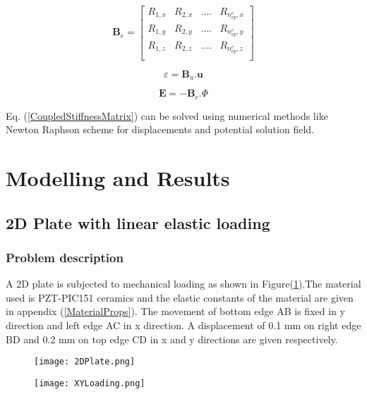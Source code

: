 \documentclass[11pt]{article}
\begin{document}
\begin{equation} \label{BeMatrix}
\textbf{B}_e =
\begin{bmatrix}
R_{1,x} & R_{2,x} & .... & R_{n_{cp}^e,x} \\
R_{1,y} & R_{2,y} & .... & R_{n_{cp}^e,y} \\
R_{1,z} & R_{2,z} & .... & R_{n_{cp}^e,z} \\
\end{bmatrix}
\end{equation}

\begin{equation}
\varepsilon = \textbf{B}_u . \textbf{u}
\end{equation}

\begin{equation}
\textbf{E} = - \textbf{B}_e . \Phi
\end{equation}

\noindent
Eq. (\ref{CoupledStiffnessMatrix}) can be solved using numerical methods like
Newton Raphson scheme for displacements and potential solution field.

\section{Modelling and Results}
\subsection{2D Plate with linear elastic loading}
\subsubsection{Problem description}
A 2D plate is subjected to mechanical loading as shown in Figure(\ref{XYLoading}).The material used is PZT-PIC151 ceramics \cite{kozinov2018simulation} and the elastic constants of the material are given in appendix (\ref{MaterialProps}).
The movement of bottom edge AB is fixed in y direction and left edge AC in x direction. A displacement of 0.1 mm on right edge BD and 0.2 mm on top edge CD in x and y directions are given respectively.
\begin{figure}[H]
	\centering
	\begin{minipage}{.5\textwidth}
		\centering
		\texttt{[image: 2DPlate.png]}
		\label{2Dplate}
	\end{minipage}%
	\begin{minipage}{.5\textwidth}
		\centering
		\texttt{[image: XYLoading.png]}
		\label{XYLoading}
	\end{minipage}
\end{figure}
\end{document}
